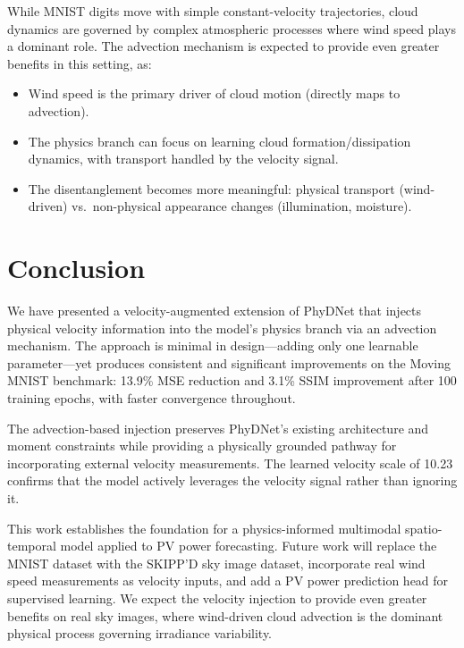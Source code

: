 \documentclass[11pt,a4paper]{article}
\begin{document}
While MNIST digits move with simple constant-velocity trajectories, cloud dynamics are governed by complex atmospheric processes where wind speed plays a dominant role. The advection mechanism is expected to provide even greater benefits in this setting, as:
\begin{itemize}[nosep]
    \item Wind speed is the primary driver of cloud motion (directly maps to advection).
    \item The physics branch can focus on learning cloud formation/dissipation dynamics, with transport handled by the velocity signal.
    \item The disentanglement becomes more meaningful: physical transport (wind-driven) vs.\ non-physical appearance changes (illumination, moisture).
\end{itemize}

\section{Conclusion}
\label{sec:conclusion}

We have presented a velocity-augmented extension of PhyDNet that injects physical velocity information into the model's physics branch via an advection mechanism. The approach is minimal in design---adding only one learnable parameter---yet produces consistent and significant improvements on the Moving MNIST benchmark: 13.9\% MSE reduction and 3.1\% SSIM improvement after 100 training epochs, with faster convergence throughout.

The advection-based injection preserves PhyDNet's existing architecture and moment constraints while providing a physically grounded pathway for incorporating external velocity measurements. The learned velocity scale of 10.23 confirms that the model actively leverages the velocity signal rather than ignoring it.

This work establishes the foundation for a physics-informed multimodal spatio-temporal model applied to PV power forecasting. Future work will replace the MNIST dataset with the SKIPP'D sky image dataset, incorporate real wind speed measurements as velocity inputs, and add a PV power prediction head for supervised learning. We expect the velocity injection to provide even greater benefits on real sky images, where wind-driven cloud advection is the dominant physical process governing irradiance variability.
\end{document}
